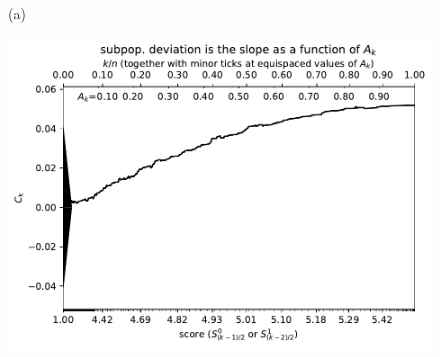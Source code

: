 \documentclass{article}
\newlength{\vertsep}
\newlength{\imsize}
\begin{document}
\begin{figure}
\begin{centering}

(a)
\parbox{\imsize}{\includegraphics[width=\imsize]
{../codes/weighted/County_of_Alameda_vs_Placer-LNGI/cumulative.pdf}}

\vspace{\vertsep}


\end{centering}
\end{figure}
\end{document}
